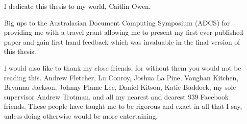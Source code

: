 I dedicate this thesis to my world, Caitlin Owen.

Big ups to the Australasian Document Computing Symposium (ADCS) for providing me with a travel grant allowing me to present my first ever published paper and gain first hand feedback which was invaluable in the final version of this thesis.

I would also like to thank my close friends, for without them you would not be reading this. Andrew Fletcher, Lu Conroy, Joshua La Pine, Vaughan Kitchen, Bryanna Jackson, Johnny Flame-Lee, Daniel Kitson, Katie Baddock, my sole supervisor Andrew Trotman, and all my nearest and dearest 939 Facebook friends. These people have taught me to be rigorous and exact in all that I say, unless doing otherwise would be more entertaining.


